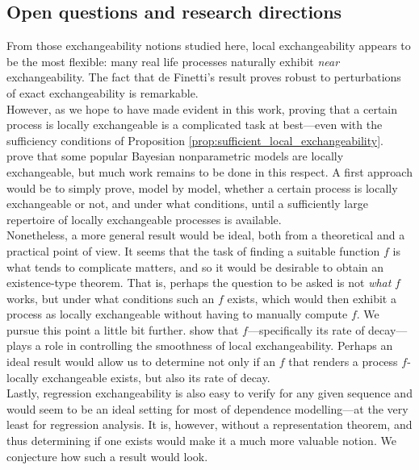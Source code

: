 \subsection{Open questions and research directions}


From those exchangeability notions studied here, local exchangeability appears to be the most flexible: many real life processes naturally exhibit \textit{near} exchangeability. The fact that de Finetti's result proves robust to perturbations of exact exchangeability is remarkable. 
\\


However, as we hope to have made evident in this work, proving that a certain process is locally exchangeable is a complicated task at best---even with the sufficiency conditions of Proposition \ref{prop:sufficient_local_exchangeability}. \cite{CampbellEtAl:2019:LocalExch} prove that some popular Bayesian nonparametric models are locally exchangeable, but much work remains to be done in this respect. A first approach would be to simply prove, model by model, whether a certain process is locally exchangeable or not, and under what conditions, until a sufficiently large repertoire of locally exchangeable processes is available. 
\\

Nonetheless, a more general result would be ideal, both from a theoretical and a practical point of view. It seems that the task of finding a suitable function $f$ is what tends to complicate matters, and so it would be desirable to obtain an existence-type theorem. That is, perhaps the question to be asked is not \textit{what} $f$ works, but under what conditions such an $f$ exists, which would then exhibit a process as locally exchangeable without having to manually compute $f$. We pursue this point a little bit further. \cite{CampbellEtAl:2019:LocalExch} show that $f$---specifically its rate of decay---plays a role in controlling the smoothness of local exchangeability. Perhaps an ideal result would allow us to determine not only if an $f$ that renders a process $f$-locally exchangeable exists, but also its rate of decay.
\\


Lastly, regression exchangeability is also easy to verify for any given sequence and would seem to be an ideal setting for most of dependence modelling---at the very least for regression analysis. It is, however, without a representation theorem, and thus determining if one exists would make it a much more valuable notion. We conjecture how such a result would look.
\\


